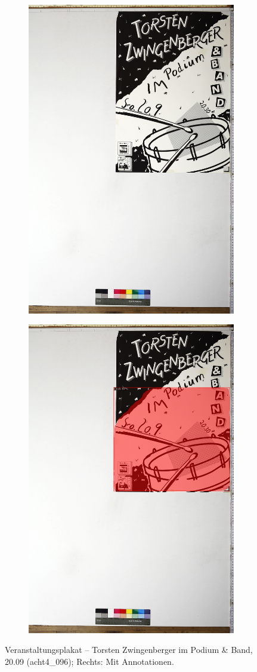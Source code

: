 \documentclass[a4paper,12pt,ngerman]{article}
\begin{document}
\newpage
\begin{landscape}
\begin{figure}[ht]
	\begin{subfigure}[b]{0.5\linewidth}
	\centering
	\includegraphics[height=\linewidth]{Abbildung_18_(acht4_096)}
	\end{subfigure}
	\begin{subfigure}[b]{0.5\linewidth}
	\centering
	\includegraphics[height=\linewidth]{Abbildung_18_(acht4_096)_with_detections}
	\end{subfigure}
	\caption{Veranstaltungsplakat -- Torsten Zwingenberger im Podium \& Band, 20.09 (acht4\_096); Rechts: Mit Annotationen.}
\end{figure}
\end{landscape}
\end{document}
